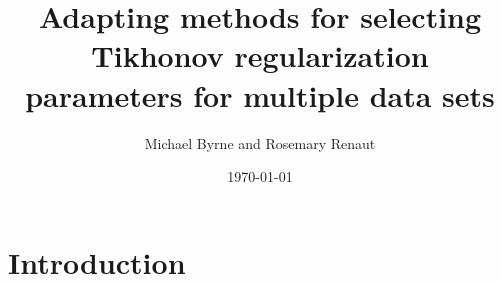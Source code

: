 \documentclass[12pt]{article}
\title{Adapting methods for selecting Tikhonov regularization parameters for multiple data sets}
\author{Michael Byrne and Rosemary Renaut}
\date{\today}
\begin{document}
\maketitle


\section{Introduction} \label{sec:Introduction}
\end{document}
